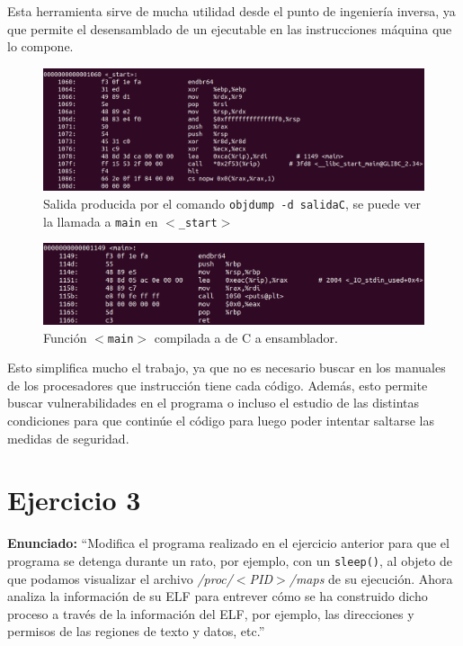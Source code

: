 \documentclass{article}
\begin{document}
\bigskip

Esta herramienta sirve de mucha utilidad desde el punto de ingeniería inversa, ya que permite el desensamblado de un ejecutable en las instrucciones máquina que lo compone.

\begin{figure}[H]
    \includegraphics[width=\textwidth]{imagenes/Captura desde 2022-11-17 17-53-55.png}
    \caption{Salida producida por el comando \texttt{objdump -d salidaC}, se puede ver la llamada a \texttt{main} en \texttt{$<$\_start$>$}}
\end{figure}


\begin{figure}[H]
    \includegraphics[width=\textwidth]{imagenes/Captura desde 2022-11-17 17-56-56.png}
    \caption{Función \texttt{$<$main$>$} compilada a de C a ensamblador.}
\end{figure}

Esto simplifica mucho el trabajo, ya que no es necesario buscar en los manuales de los procesadores que instrucción tiene cada código. Además, esto permite buscar vulnerabilidades en el programa o incluso el estudio de las distintas condiciones para que continúe el código para luego poder intentar saltarse las medidas de seguridad.

\bigskip

{}
\section*{Ejercicio 3}

\textbf{Enunciado: }``Modifica el programa realizado en el ejercicio anterior para que el programa se detenga durante un rato, por ejemplo, con un \texttt{sleep()}, al objeto de que podamos visualizar el archivo \textit{/proc/$<$PID$>$/maps} de su ejecución. Ahora analiza la información de su ELF para entrever cómo se ha construido dicho proceso a través de la información del ELF, por ejemplo, las direcciones y permisos de las regiones de texto y datos, etc.''
\end{document}
